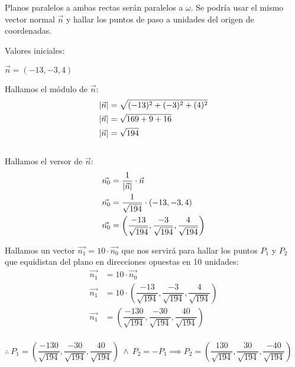\noindent Planos paralelos a ambas rectas serán paralelos a $\omega$. Se podría usar el mismo vector normal $\vec{n}$ y hallar los puntos de paso a unidades del origen de coordenadas.

\noindent Valores iniciales:
\begin{center}
	$\vec{n} = (-13, -3, 4)$
\end{center}

\begin{multicols}{2}
	\noindent Hallamos el módulo de $\vec{n}$:
	\begin{align*}
		\lvert\vec{n}\rvert & = \sqrt{(-13)^2 + (-3)^2 + (4)^2} \\
		\lvert\vec{n}\rvert & = \sqrt{169 + 9 + 16}             \\
		\lvert\vec{n}\rvert & = \sqrt{194}
	\end{align*}
	\columnbreak \\
	\noindent Hallamos el versor de $\vec{n}$:
	\begin{align*}
		\vec{n_0} & = \dfrac{1}{\lvert\vec{n}\rvert} \cdot \vec{n}                                             \\
		\vec{n_0} & = \dfrac{1}{\sqrt{194}} \cdot (-13, -3, 4)                                             \\
		\vec{n_0} & = \left(\dfrac{-13}{\sqrt{194}}, \dfrac{-3}{\sqrt{194}}, \dfrac{4}{\sqrt{194}} \right)
	\end{align*}
\end{multicols}

\noindent Hallamos un vector $\vec{n_1} = 10 \cdot \vec{n_0}$ que nos servirá para hallar los puntos $P_1$ y $P_2$ que equidistan del plano en direcciones opuestas en 10 unidades:
\begin{align*}
	\vec{n_1} & = 10 \cdot \vec{n_0}                                                                           \\
	\vec{n_1} & = 10 \cdot \left(\dfrac{-13}{\sqrt{194}}, \dfrac{-3}{\sqrt{194}}, \dfrac{4}{\sqrt{194}} \right) \\
	\vec{n_1} & = \left(\dfrac{-130}{\sqrt{194}}, \dfrac{-30}{\sqrt{194}}, \dfrac{40}{\sqrt{194}} \right)       \\
\end{align*}
\begin{center}
	$\therefore \ \boxed{P_1 = \left(\dfrac{-130}{\sqrt{194}}, \dfrac{-30}{\sqrt{194}}, \dfrac{40}{\sqrt{194}} \right)}
		\ \land \ P_2 = -P_1 \implies
		\boxed{P_2 = \left(\dfrac{130}{\sqrt{194}}, \dfrac{30}{\sqrt{194}}, \dfrac{-40}{\sqrt{194}} \right)}$
\end{center}

